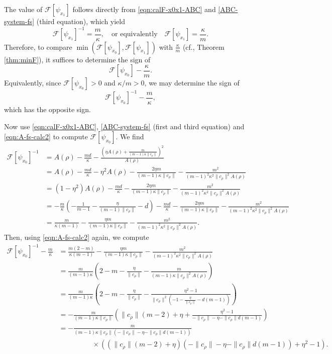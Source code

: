 \documentclass[11pt]{amsart}
\newcommand{\dm}{d} %
\begin{document}
The value of $\mathcal{F}[\psi_{x_1}]$ follows directly from \eqref{eqn:calF-x0x1-ABC} and \eqref{ABC-system-fs} (third equation), which yield
\begin{equation}
\label{eqn:calFi-x1-fs}
\mathcal{F}[\psi_{x_1}]^{-1} =\frac{m}{\kappa},
\quad\text{or equivalently}\quad
\mathcal{F}[\psi_{x_1}] =\frac{\kappa}{m}.
\end{equation}
Therefore, to compare $\min(\mathcal{F}[\psi_{x_0}],\mathcal{F}[\psi_{x_1}])$ with $\frac{\kappa}{m}$ (cf., Theorem \ref{thm:minF}), it suffices to determine the sign of
\[
\mathcal{F}[\psi_{x_0}]-\frac{\kappa}{m}.
\]
Equivalently, since $\mathcal{F}[\psi_{x_0}]>0$ and $\kappa/m>0$, we may determine the sign of
\[
\mathcal{F}[\psi_{x_0}]^{-1}-\frac{m}{\kappa},
\]
which has the opposite sign. 

Now use \eqref{eqn:calF-x0x1-ABC}, \eqref{ABC-system-fs} (first and third equation) and \eqref{eqn:A-fs-calc2} to compute $\mathcal{F}[\psi_{x_0}]$. We find
\begin{align*}
\mathcal{F}[\psi_{x_0}]^{-1}
&=A(\rho)-\frac{m\dm}{\kappa}-\frac{\left(\eta A(\rho)+\frac{m}{(m-1)\kappa \|c_\rho\|}\right)^2}{A(\rho)}\\
&=A(\rho)-\frac{m\dm}{\kappa}-\eta^2 A(\rho)-\frac{2\eta m }{(m-1)\kappa \|c_\rho\|}-\frac{m^2}{(m-1)^2\kappa^2 \|c_\rho\|^2 A(\rho)}\\
&=(1-\eta^2)A(\rho)-\frac{m\dm}{\kappa}-\frac{2\eta m }{(m-1)\kappa \|c_\rho\|}-\frac{m^2}{(m-1)^2\kappa^2 \|c_\rho\|^2 A(\rho)}\\
&=-\frac{m}{\kappa}\left(-\frac{1}{m-1}-\frac{\eta}{(m-1)\|c_\rho\|}-\dm\right)-\frac{m\dm}{\kappa}-\frac{2\eta m }{(m-1)\kappa \|c_\rho\|}-\frac{m^2}{(m-1)^2\kappa^2 \|c_\rho\|^2 A(\rho)}\\
&=\frac{m}{\kappa(m-1)}-\frac{\eta m}{(m-1)\kappa \|c_\rho\|}-\frac{m^2}{(m-1)^2\kappa^2 \|c_\rho\|^2 A(\rho)}.
\end{align*}
Then, using \eqref{eqn:A-fs-calc2} again, we compute 
\begin{align*}
\mathcal{F}[\psi_{x_0}]^{-1}-\frac{m}{\kappa}&=\frac{m(2-m)}{\kappa(m-1)}-\frac{\eta m}{(m-1)\kappa \|c_\rho\|}-\frac{m^2}{(m-1)^2\kappa^2 \|c_\rho\|^2 A(\rho)}\\
&=\frac{m}{(m-1)\kappa}\left(2-m-\frac{\eta}{\|c_\rho\|}-\frac{m}{(m-1)\kappa \|c_\rho\|^2 A(\rho)}\right)\\
&=\frac{m}{(m-1)\kappa}\left(2-m-\frac{\eta}{\|c_\rho\|}-\frac{\eta^2-1}{ \|c_\rho\|^2 \left( -1-\frac{\eta}{\|c_\rho\|}-\dm(m-1)\right)}\right)\\
&=-\frac{m}{(m-1)\kappa \|c_\rho\|}\left( \|c_\rho\|(m-2)+\eta+\frac{\eta^2-1}{ -\|c_\rho\| -\eta-\|c_\rho\|\dm(m-1)}\right)\\
&=-\frac{m}{(m-1)\kappa \|c_\rho\|(-\|c_\rho\|-\eta- \|c_\rho\|\dm(m-1))}\\[5pt]
&\hspace{2cm}\times\left((\|c_\rho\|(m-2)+\eta)(-\|c_\rho\|-\eta-\|c_\rho\|\dm(m-1))+\eta^2-1\right).
\end{align*}
\end{document}
